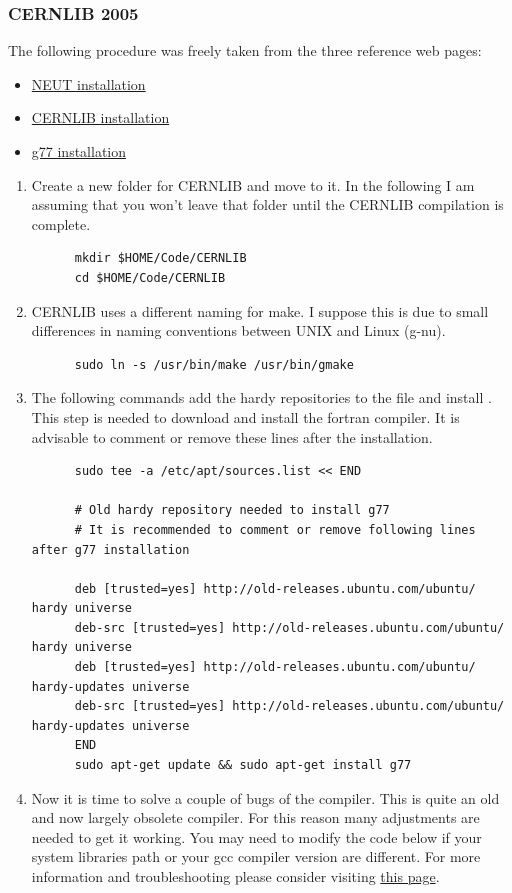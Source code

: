 \subsubsection{CERNLIB 2005}\label{sec:cernlib-2005}
The following procedure was freely taken from the three reference web pages:
\begin{itemize}
\item \href{https://www.t2k.org/asg/xsec/niwgdocs/neut/install_neut}{NEUT
    installation}
\item
  \href{https://www-zeuthen.desy.de/linear_collider/cernlib/new/cernlib_2005.html}%
  {CERNLIB installation }
\item \href{http://seanelvidge.com/2017/01/install-g77-on-ubuntu-14-04/}{g77
    installation}
\end{itemize}
\begin{enumerate}[resume]
\item Create a new folder for CERNLIB and move to it. In the following I am
  assuming that you won't leave that folder until the CERNLIB compilation is
  complete.
\begin{lstlisting}
      mkdir $HOME/Code/CERNLIB
      cd $HOME/Code/CERNLIB
\end{lstlisting}
\item CERNLIB uses a different naming for make. I suppose this is due to small
  differences in naming conventions between UNIX and Linux (g-nu).%
\begin{lstlisting}
      sudo ln -s /usr/bin/make /usr/bin/gmake
\end{lstlisting}
\item The following commands add the hardy repositories to the
   file and install . This step is
  needed to download and install the fortran  compiler. It is
  advisable to comment or remove these lines after the 
  installation.%
\begin{lstlisting}
      sudo tee -a /etc/apt/sources.list << END

      # Old hardy repository needed to install g77
      # It is recommended to comment or remove following lines after g77 installation
      
      deb [trusted=yes] http://old-releases.ubuntu.com/ubuntu/ hardy universe
      deb-src [trusted=yes] http://old-releases.ubuntu.com/ubuntu/ hardy universe
      deb [trusted=yes] http://old-releases.ubuntu.com/ubuntu/ hardy-updates universe
      deb-src [trusted=yes] http://old-releases.ubuntu.com/ubuntu/ hardy-updates universe
      END
      sudo apt-get update && sudo apt-get install g77
\end{lstlisting}
\item Now it is time to solve a couple of bugs of the 
  compiler. This is quite an old and now largely obsolete compiler. For this
  reason many adjustments are needed to get it working. You may need to modify
  the code below if your system libraries path or your gcc compiler version are
  different. For more information and troubleshooting please consider visiting
  \href{http://seanelvidge.com/2017/01/install-g77-on-ubuntu-14-04/}{this page}.


\end{enumerate}
